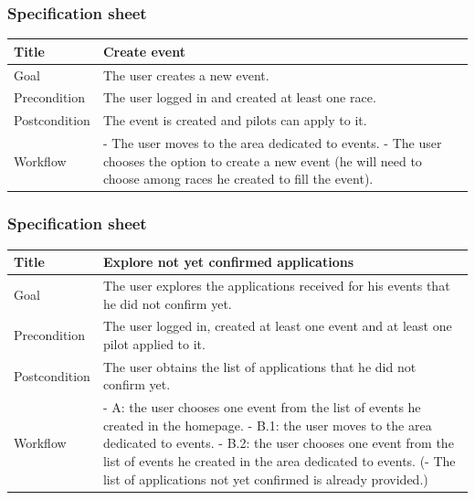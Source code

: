 \documentclass{beamer}
\begin{document}
\begin{frame}
    \frametitle{Specification sheet}
    \begin{table}
        \tiny
        \begin{tabular}{|p{2cm}|p{6cm}|}
        \hline
        Title & \textbf{Create event} \\
        \hline
        Goal & The user creates a new event. \\
        \hline
        Precondition & The user logged in and created at least one race.\\
        \hline
        Postcondition & The event is created and pilots can apply to it. \\
        \hline
        Workflow &
        - The user moves to the area dedicated to events. \newline
        - The user chooses the option to create a new event (he will need to choose among races he created
        to fill the event). \\
        \hline
        \end{tabular}
\end{table}
\end{frame}

\begin{frame}
    \frametitle{Specification sheet}
    \begin{table}
        \tiny
        \begin{tabular}{|p{2cm}|p{6cm}|}
        \hline
        Title & \textbf{Explore not yet confirmed applications} \\
        \hline
        Goal & The user explores the applications received for his events that he did not confirm yet. \\
        \hline
        Precondition & The user logged in, created at least one event and at least one pilot applied to it.\\
        \hline
        Postcondition & The user obtains the list of applications that he did not confirm yet. \\
        \hline
        Workflow &
        - A: the user chooses one event from the list of events he created in the homepage. \newline
        - B.1: the user moves to the area dedicated to events. \newline
        - B.2: the user chooses one event from the list of events he created in the area dedicated to events. \newline
        (- The list of applications not yet confirmed is already provided.) \\
        \hline
        \end{tabular}
\end{table}
\end{frame}
\end{document}
